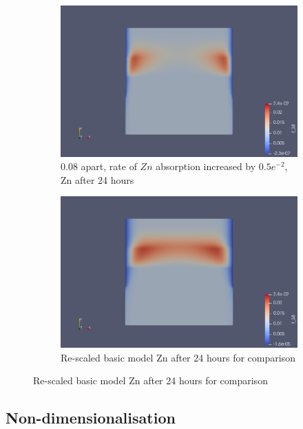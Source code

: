 \documentclass[11pt]{article}
\numberwithin{equation}{section}
\begin{document}
 \begin{figure}
     \centering
     \begin{subfigure}[t]{0.45\textwidth}
     \includegraphics[width=\textwidth]{Figures/testpics/IncreasedZnAbsorbZn24.png}
     \caption{0.08 apart, rate of $Zn$ absorption increased by $0.5e^{-2}$, Zn after 24 hours}
     \end{subfigure}
     \begin{subfigure}[t]{0.45\textwidth}
     \includegraphics[width=\textwidth]{Figures/testpics/24rescaledZinc.png}
     \caption{Re-scaled basic model Zn after 24 hours for comparison}
     \end{subfigure}
 \end{figure}



\newpage
\subsection{Non-dimensionalisation}
\label{2-Base-Scaling}
\end{document}
